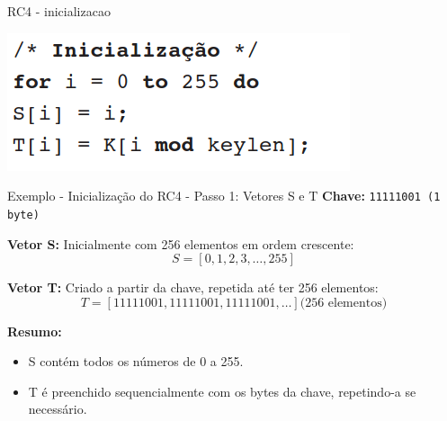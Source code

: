 \begin{frame}{RC4 - inicializacao}

    

    \includegraphics[width=\linewidth]{Figuras/rc4-inicializacao.png}



\end{frame}

\begin{frame}{Exemplo - Inicialização do RC4 - Passo 1: Vetores S e T}
\textbf{Chave:} \texttt{11111001 (1 byte)}

\bigskip

\textbf{Vetor S:} Inicialmente com 256 elementos em ordem crescente:
\[
S = [0, 1, 2, 3, \dots, 255]
\]

\textbf{Vetor T:} Criado a partir da chave, repetida até ter 256 elementos:
\[
T = [11111001, 11111001, 11111001, \dots] \text{(256 elementos)}
\]

\bigskip
\textbf{Resumo:} 
\begin{itemize}
    \item S contém todos os números de 0 a 255.
    \item T é preenchido sequencialmente com os bytes da chave, repetindo-a se necessário.
\end{itemize}
\end{frame}

